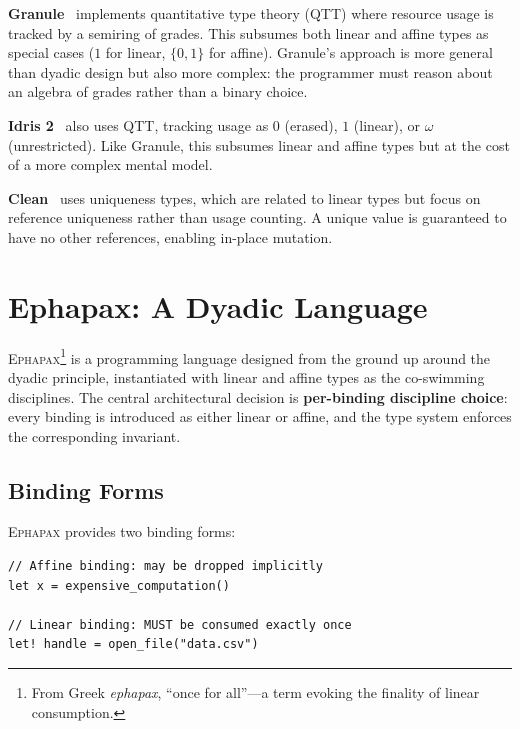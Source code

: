 \documentclass[11pt,a4paper]{article}
\newcommand{\Ephapax}{\textsc{Ephapax}}
\begin{document}
\textbf{Granule}~\citep{orchard2019quantitative} implements quantitative type
theory (QTT) where resource usage is tracked by a semiring of grades. This
subsumes both linear and affine types as special cases ($1$ for linear,
$\{0,1\}$ for affine). Granule's approach is more general than dyadic design
but also more complex: the programmer must reason about an algebra of grades
rather than a binary choice.

\textbf{Idris 2}~\citep{brady2021idris2} also uses QTT, tracking usage as
$0$ (erased), $1$ (linear), or $\omega$ (unrestricted). Like Granule, this
subsumes linear and affine types but at the cost of a more complex mental model.

\textbf{Clean}~\citep{barendsen1996uniqueness} uses uniqueness types, which are
related to linear types but focus on reference uniqueness rather than usage
counting. A unique value is guaranteed to have no other references, enabling
in-place mutation.

\section{Ephapax: A Dyadic Language}
\label{sec:ephapax}

\Ephapax{}\footnote{From Greek \textit{ephapax}, ``once for all''---a term evoking the finality of linear consumption.} is a
programming language designed from the ground up around the dyadic principle,
instantiated with linear and affine types as the co-swimming disciplines. The
central architectural decision is \textbf{per-binding discipline choice}: every
binding is introduced as either linear or affine, and the type system enforces
the corresponding invariant.

\subsection{Binding Forms}

\Ephapax{} provides two binding forms:

\begin{lstlisting}[language=Ephapax, caption={The two binding forms of \Ephapax{}.}]
// Affine binding: may be dropped implicitly
let x = expensive_computation()

// Linear binding: MUST be consumed exactly once
let! handle = open_file("data.csv")
\end{lstlisting}
\end{document}
